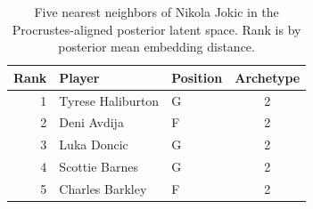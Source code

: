 \begin{table}[htbp]
  \centering\small
  \begin{tabular}{rllc}
    \toprule
    Rank & Player & Position & Archetype \\
    \midrule
    1 & Tyrese Haliburton & G & 2 \\
    2 & Deni Avdija & F & 2 \\
    3 & Luka Doncic & G & 2 \\
    4 & Scottie Barnes & G & 2 \\
    5 & Charles Barkley & F & 2 \\
    \bottomrule
  \end{tabular}
  \caption{Five nearest neighbors of Nikola Jokic in the Procrustes-aligned posterior latent space. Rank is by posterior mean embedding distance.}
  \label{tab:Nikola_Jokic_neighbors}
\end{table}


